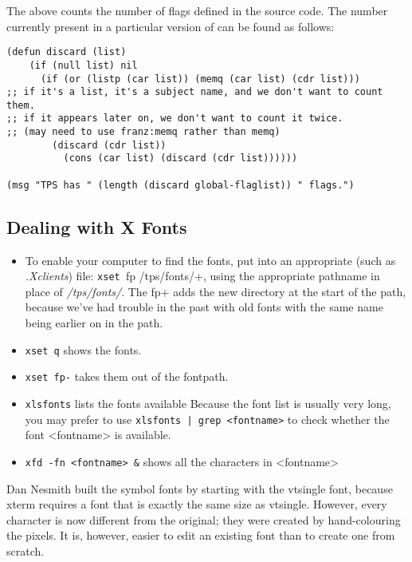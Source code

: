 The above counts the number of flags defined in the source code. The
number currently present in a particular version of \TPS can be found as follows:

\begin{verbatim}
(defun discard (list)
	(if (null list) nil
	  (if (or (listp (car list)) (memq (car list) (cdr list)))
;; if it's a list, it's a subject name, and we don't want to count them.
;; if it appears later on, we don't want to count it twice.
;; (may need to use franz:memq rather than memq)
	    (discard (cdr list))
	      (cons (car list) (discard (cdr list))))))

(msg "TPS has " (length (discard global-flaglist)) " flags.")
\end{verbatim}

\subsection{Dealing with X Fonts}

\begin{itemize}
\item To enable your computer to find the fonts, put into an appropriate 
(such as {\it .Xclients}) file: {\tt xset }fp /tps/fonts/+,
using the appropriate pathname in place of {\it /tps/fonts/}. The {\tt }fp+
adds the new directory at the start of the path, because we've had trouble 
in the past with old fonts with the same name being earlier on in the path.

\item {\tt xset q} shows the fonts.

\item {\tt xset fp-} takes them out of the fontpath.

\item {\tt xlsfonts} lists the fonts available
Because the font list is usually very long,
you may prefer to use
{\tt xlsfonts | grep <fontname>} to check whether the font <fontname> 
is available.

\item {\tt xfd -fn <fontname> \&} shows all the characters in <fontname>
\end{itemize}

Dan Nesmith built the symbol fonts by starting with
the vtsingle font, because xterm requires a font that is
exactly the same size as vtsingle.  However, every
character is now different from the original; they were created by hand-colouring 
the pixels. It is, however, easier to
edit an existing font than to create one from scratch.

